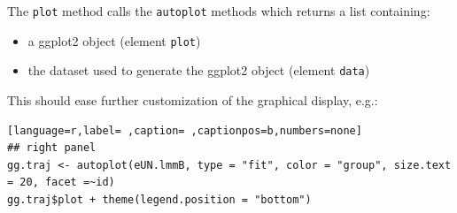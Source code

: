 \documentclass[12pt]{article}
\begin{document}
\clearpage

The \texttt{plot} method calls the \texttt{autoplot} methods which returns a list
containing:
\begin{itemize}
\item a ggplot2 object (element \texttt{plot})
\item the dataset used to generate the ggplot2 object (element \texttt{data})
\end{itemize}
This should ease further customization of the graphical display, e.g.:
\begin{lstlisting}[language=r,label= ,caption= ,captionpos=b,numbers=none]
## right panel
gg.traj <- autoplot(eUN.lmmB, type = "fit", color = "group", size.text = 20, facet =~id)
gg.traj$plot + theme(legend.position = "bottom")
\end{lstlisting}
\end{document}

